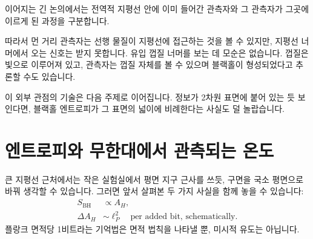 이어지는 긴 논의에서는 전역적 지평선 안에 이미 들어간 관측자와 그 관측자가 그곳에 이르게 된 과정을 구분합니다.

\begin{classroomqa}
\end{classroomqa}

따라서 먼 거리 관측자는 선행 물질이 지평선에 접근하는 것을 볼 수 있지만, 지평선 너머에서 오는 신호는 받지 못합니다. 유입 껍질 너머를 보는 데 모순은 없습니다. 껍질은 빛으로 이루어져 있고, 관측자는 껍질 자체를 볼 수 있으며 블랙홀이 형성되었다고 추론할 수도 있습니다.

\begin{classroomqa}
\end{classroomqa}

\begin{classroomqa}
\end{classroomqa}

이 외부 관점의 기술은 다음 주제로 이어집니다. 정보가 2차원 표면에 붙어 있는 듯 보인다면, 블랙홀 엔트로피가 그 표면의 넓이에 비례한다는 사실도 덜 놀랍습니다.

\section{엔트로피와 무한대에서 관측되는 온도}

큰 지평선 근처에서는 작은 실험실에서 평면 지구 근사를 쓰듯, 구면을 국소 평면으로 바꿔 생각할 수 있습니다. 그러면 앞서 살펴본 두 가지 사실을 함께 놓을 수 있습니다:
\begin{equation}
\begin{aligned}
S_{\mathrm{BH}}&\propto A_H,\\
\Delta A_H&\sim \ell_P^2
\quad\text{per added bit, schematically}.
\end{aligned}
\end{equation}
플랑크 면적당 1비트라는 기억법은 면적 법칙을 나타낼 뿐, 미시적 유도는 아닙니다.

